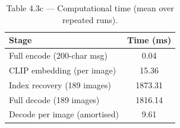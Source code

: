 \begin{table}[htbp]
\centering
\caption{Table 4.3c — Computational time (mean over repeated runs).}
\label{tab:table_4_3_timing}
\begin{tabular}{lc}
\hline
Stage & Time (ms) \\
\hline
Full encode (200-char msg) & 0.04 \\
CLIP embedding (per image) & 15.36 \\
Index recovery (189 images) & 1873.31 \\
Full decode (189 images) & 1816.14 \\
Decode per image (amortised) & 9.61 \\
\hline
\end{tabular}
\end{table}
